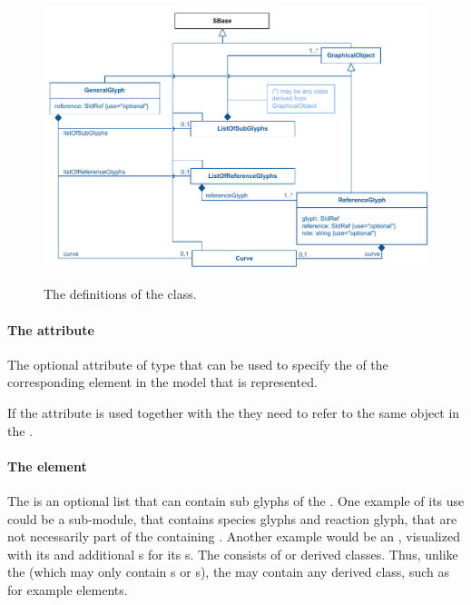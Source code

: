 \begin{figure}[ht]
\includegraphics[scale=0.9]{uml/layout-generalglyph-model-uml}\\
\label{uml:generalglyph}
\caption{The definitions of the \GeneralGlyph class.}
\end{figure}

\paragraph{The  attribute}
The optional  attribute of type  that 
can be used to specify the  of the corresponding element in 
the model that is represented. 

If the  attribute is used together with the  
they need to refer to the same object in the \Model.

\paragraph {The  element}
\label{listofsubglyphs-class}
The \ListOfSubGlyphs is an optional list that can contain sub glyphs of 
the \GeneralGlyph. One example of its use could be a sub-module, that 
contains species glyphs and reaction glyph, that are not necessarily 
part of the containing \Model. Another example would be an \Event, 
visualized with its \Trigger and additional {\GeneralGlyph}s for its 
{\EventAssignment}s. The \ListOfSubGlyphs consists of \GraphicalObject 
or derived classes. Thus, unlike the \ListOfAdditionalGraphicalObjects 
(which may only contain {\GraphicalObject}s or {\GeneralGlyph}s), the 
 may contain any derived class, such as for 
example \TextGlyph elements. 


